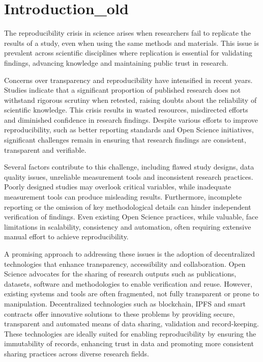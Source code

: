\section{Introduction_old}


The reproducibility crisis in science arises when researchers fail to replicate the results of a study, even when using the same methods and materials. This issue is prevalent across scientific disciplines where replication is essential for validating findings, advancing knowledge and maintaining public trust in research.

Concerns over transparency and reproducibility have intensified in recent years. Studies indicate that a significant proportion of published research does not withstand rigorous scrutiny when retested, raising doubts about the reliability of scientific knowledge. This crisis results in wasted resources, misdirected efforts and diminished confidence in research findings. Despite various efforts to improve reproducibility, such as better reporting standards and Open Science initiatives, significant challenges remain in ensuring that research findings are consistent, transparent and verifiable.

Several factors contribute to this challenge, including flawed study designs, data quality issues, unreliable measurement tools and inconsistent research practices. Poorly designed studies may overlook critical variables, while inadequate measurement tools can produce misleading results. Furthermore, incomplete reporting or the omission of key methodological details can hinder independent verification of findings. Even existing Open Science practices, while valuable, face limitations in scalability, consistency and automation, often requiring extensive manual effort to achieve reproducibility.

A promising approach to addressing these issues is the adoption of decentralized technologies that enhance transparency, accessibility and collaboration. Open Science advocates for the sharing of research outputs such as publications, datasets, software and methodologies to enable verification and reuse. However, existing systems and tools are often fragmented, not fully transparent  or prone to manipulation. Decentralized technologies such as blockchain, IPFS and smart contracts offer innovative solutions to these problems by providing secure, transparent and automated means of data sharing, validation and record-keeping. These technologies are ideally suited for enabling reproducibility by ensuring the immutability of records, enhancing trust in data and promoting more consistent sharing practices across diverse research fields.

